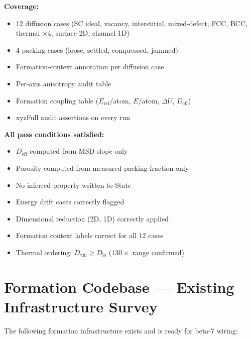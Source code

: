 \documentclass[11pt,a4paper]{article}
\begin{document}
\vspace{0.8em}
\textbf{Coverage:}
\begin{itemize}[noitemsep]
	\item 12 diffusion cases (SC ideal, vacancy, interstitial, mixed-defect, FCC, BCC, thermal $\times4$, surface 2D, channel 1D)
	\item 4 packing cases (loose, settled, compressed, jammed)
	\item Formation-context annotation per diffusion case
	\item Per-axis anisotropy audit table
	\item Formation coupling table ($E_\text{ref}$/atom, $E$/atom, $\Delta U$, $D_\text{eff}$)
	\item xyzFull audit assertions on every run
\end{itemize}

\textbf{All pass conditions satisfied:}
\begin{itemize}[noitemsep]
	\item $D_\text{eff}$ computed from MSD slope only \checkmark
	\item Porosity computed from measured packing fraction only \checkmark
	\item No inferred property written to State \checkmark
	\item Energy drift cases correctly flagged \checkmark
	\item Dimensional reduction (2D, 1D) correctly applied \checkmark
	\item Formation context labels correct for all 12 cases \checkmark
	\item Thermal ordering: $D_\text{vhi} \ge D_\text{lo}$ ($130\times$ range confirmed) \checkmark
\end{itemize}

\section{Formation Codebase --- Existing Infrastructure Survey}

The following formation infrastructure exists and is ready for beta-7 wiring:
\end{document}
